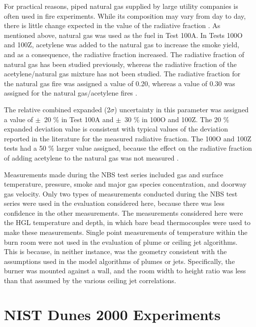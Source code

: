 For practical reasons, piped natural gas supplied by large utility companies is often used in fire experiments.  While its composition may vary from day to day, there is little change expected in the value of the radiative fraction \cite{NRCNUREG1824Experimental}. As mentioned above, natural gas was used as the fuel in Test 100A.  In Tests 100O and 100Z, acetylene was added to the natural gas to increase the smoke yield, and as a consequence, the radiative fraction increased.  The radiative fraction of natural gas has been studied previously, whereas the radiative fraction of the acetylene/natural gas mixture has not been studied. The radiative fraction for the natural gas fire was assigned a value of 0.20, whereas a value of 0.30 was assigned for the natural gas/acetylene fires \cite{NRCNUREG1824Experimental, Hamins:1991}.  

The relative combined expanded (2$\sigma$) uncertainty in this parameter was assigned a value of $\pm$~20 \% in Test 100A and $\pm$~30 \% in 100O and 100Z.  The 20 \% expanded deviation value is consistent with typical values of the deviation reported in the literature for the measured radiative fraction.  The 100O and 100Z tests had a 50 \% larger value assigned, because the effect on the radiative fraction of adding acetylene to the natural gas was not measured \cite{NRCNUREG1824Experimental}.

Measurements made during the NBS test series included gas and surface temperature, pressure, smoke and major gas species concentration, and doorway gas velocity.  Only two types of measurements conducted during the NBS test series were used in the evaluation considered here, because there was less confidence in the other measurements.  The measurements considered here were the HGL temperature and depth, in which bare bead thermocouples were used to make these measurements.  Single point measurements of temperature within the burn room were not used in the evaluation of plume or ceiling jet algorithms.  This is because, in neither instance, was the geometry consistent with the assumptions used in the model algorithms of plumes or jets. Specifically, the burner was mounted against a wall, and the room width to height ratio was less than that assumed by the various ceiling jet correlations.

\section{NIST Dunes 2000 Experiments}

